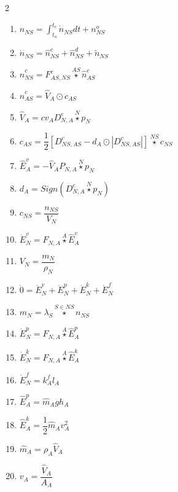 \documentclass[10pt,a4paper]{report}
\begin{document}
	\begin{multicols}{2}
	\begin{enumerate}
		\item $n_{NS} = \int_{t_o}^{t_e} \dot{n}_{NS} dt + n^{o}_{NS}$
		\item $\dot{n}_{NS} = \hat{n}^{c}_{NS} + \hat{n}^{d}_{NS} + \tilde{n}_{NS}$
		\item $\hat{n}^{c}_{NS} = F^{c}_{AS,NS} \overset{AS}{\star} \hat{n}^{c}_{AS}$
		\item $\hat{n}^{c}_{AS} = \hat{V}_{A} \odot c_{AS}$
		\item $\hat{V}_{A} = cv_A D^{c}_{N,A} \overset{N}{\star} p_N$
		\item $c_{AS} = \dfrac{1}{2} \left[ D^{c}_{NS,AS} - d_A \odot \left|D^{c}_{NS,AS} \right|  \right] \overset{NS}{\star} c_{NS}$
		\item $\hat{E}^{v}_{A} = -\hat{V}_{A} P_{N,A} \overset{N}{\star} p_N$
		\item $d_A = Sign(D^{c}_{N,A} \overset{N}{\star} p_N)$
		\item $c_{NS} = \dfrac{n_{NS}}{V_N}$
		\item $\dot{E}^{v}_N = F_{N,A} \overset{A}{\star} \hat{E}^{v}_{A}$
		\item $V_N = \dfrac{m_N}{\rho_N}$
		\item $\dot{0} = \dot{E}^{v}_N + \dot{E}^{p}_N + \dot{E}^{k}_N + \dot{E}^{f}_N$
		\item $m_N = \lambda_S \overset{S \in NS}{\star} n_{NS}$
		\item $\dot{E}^{p}_N = F_{N,A} \overset{A}{\star} \hat{E}^{p}_{A}$
		\item $\dot{E}^{k}_N = F_{N,A} \overset{A}{\star} \hat{E}^{k}_{A}$
		\item $\dot{E}^{f}_N = k^{f}_A l_A$
		\item $\hat{E}^{p}_{A} = \hat{m}_A g h_A$
		\item $\hat{E}^{k}_{A} = \dfrac{1}{2} \hat{m}_A v_A^2$
		\item $\hat{m}_A = \rho_A \hat{V}_{A}$
		\item $v_A = \dfrac{\hat{V}_{A}}{A_A} $
	\end{enumerate}
\end{multicols}	
\end{document}
